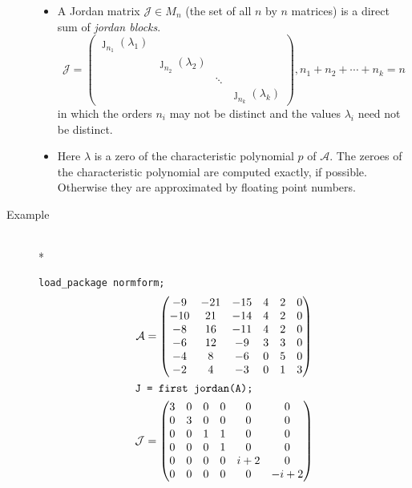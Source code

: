 \begin{description}
\begin{itemize}
\item A Jordan matrix $\mathcal{J} \in M_{n}$ (the set of all $n$ by $n$ 
      matrices) is a direct sum of {\it jordan blocks}.
%
      \begin{displaymath}
      \mathcal{J} = \begin{pmatrix} \jmath_{n_1}(\lambda_{1}) 
      \\  & \jmath_{n_2}(\lambda_{2}) \\ & & \ddots \\ & & & 
      \jmath_{n_k}(\lambda_{k}) \end{pmatrix},
       n_{1}+ n_{2}+\cdots +n_{k} = n
      \end{displaymath}
%
      in which the orders $n_{i}$ may not be distinct and the 
      values ${\lambda_{i}}$ need not be distinct.

\item Here ${\lambda}$ is a zero of the characteristic polynomial 
      $p$ of $\mathcal{A}$. The zeroes of the characteristic 
      polynomial are computed exactly, if possible. Otherwise they are 
      approximated by floating point numbers.
\end{itemize}      

\item[Example]\mbox{}\\*

\texttt{load\_package normform;}
\begin{gather*}
\mathcal{A} = \begin{pmatrix} -9 & -21 & -15 & 4 & 2 & 0 \\
-10 & 21 & -14 & 4 & 2 & 0 \\ -8 & 16 & -11 & 4 & 2 & 0 \\ -6 & 12 & -9 
& 3 & 3 & 0 \\ -4 & 8 & -6 & 0 & 5 & 0 \\ -2 & 4 & -3 & 0 & 1 & 3 
\end{pmatrix} \\ 
\intertext{\texttt{J = first jordan(A);}}
%
\mathcal{J} = \begin{pmatrix} 3 & 0 & 0 & 0 & 0 & 0 \\ 0 & 3 
& 0 & 0 & 0 & 0 \\ 0 & 0 & 1 & 1 & 0 & 0 \\ 0 & 0 & 0 & 1 & 0 & 0 \\
 0 & 0 & 0 & 0 & i+2 & 0 \\ 0 & 0 & 0 & 0 & 0 & -i+2 
\end{pmatrix}
\end{gather*}
\end{description}


